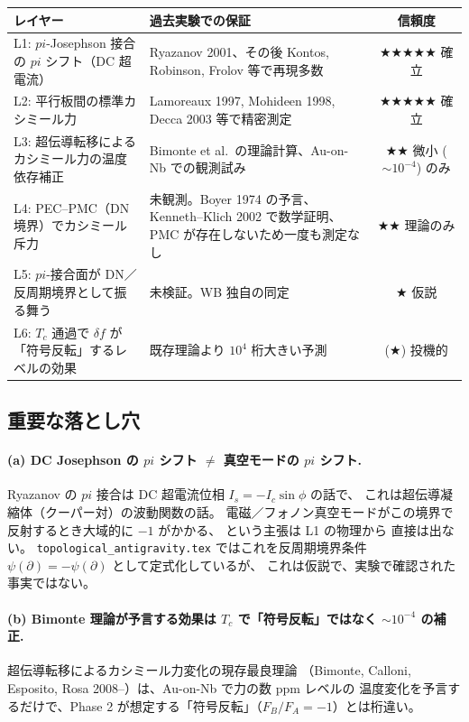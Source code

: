 \documentclass[11pt,a4paper]{article}
\def\pi{pi}%
\def\textbf#1{#1}%
\begin{document}
\begin{center}
\renewcommand{\arraystretch}{1.25}
\begin{tabular}{p{}p{}c}
\toprule
レイヤー & 過去実験での保証 & 信頼度 \\
\midrule
L1: $\pi$-Josephson 接合の $\pi$ シフト（DC 超電流） &
Ryazanov 2001、その後 Kontos, Robinson, Frolov 等で再現多数 &
$\bigstar\bigstar\bigstar\bigstar\bigstar$ 確立 \\
\midrule
L2: 平行板間の標準カシミール力 &
Lamoreaux 1997, Mohideen 1998, Decca 2003 等で精密測定 &
$\bigstar\bigstar\bigstar\bigstar\bigstar$ 確立 \\
\midrule
L3: 超伝導転移によるカシミール力の温度依存補正 &
Bimonte et al.\ の理論計算、Au-on-Nb での観測試み &
$\bigstar\bigstar$ 微小 ($\sim 10^{-4}$) のみ \\
\midrule
L4: PEC--PMC（DN 境界）でカシミール斥力 &
\textbf{未観測}。Boyer 1974 の予言、Kenneth--Klich 2002 で数学証明、
PMC が存在しないため一度も測定なし &
$\bigstar\bigstar$ 理論のみ \\
\midrule
L5: $\pi$-接合面が DN／反周期境界として振る舞う &
\textbf{未検証}。WB 独自の同定 &
$\bigstar$ 仮説 \\
\midrule
L6: $T_c$ 通過で $\delta f$ が「符号反転」するレベルの効果 &
\textbf{既存理論より $10^4$ 桁大きい予測} &
($\bigstar$) 投機的 \\
\bottomrule
\end{tabular}
\end{center}

\subsection{重要な落とし穴}

\paragraph{(a) DC Josephson の $\pi$ シフト $\neq$ 真空モードの $\pi$ シフト.}
Ryazanov の $\pi$ 接合は DC 超電流位相 $I_s = -I_c\sin\phi$ の話で、
これは超伝導凝縮体（クーパー対）の波動関数の話。
電磁／フォノン真空モードがこの境界で反射するとき大域的に $-1$ がかかる、
という主張は L1 の物理から \textbf{直接は出ない}。
\texttt{topological\_antigravity.tex} ではこれを反周期境界条件
$\psi(\partial)=-\psi(\partial)$ として定式化しているが、
これは仮説で、実験で確認された事実ではない。

\paragraph{(b) Bimonte 理論が予言する効果は $T_c$ で「符号反転」ではなく $\sim 10^{-4}$ の補正.}
超伝導転移によるカシミール力変化の現存最良理論
（Bimonte, Calloni, Esposito, Rosa 2008--）は、Au-on-Nb で力の数 ppm レベルの
温度変化を予言するだけで、Phase 2 が想定する「符号反転」（$F_B/F_A = -1$）とは桁違い。
\end{document}
